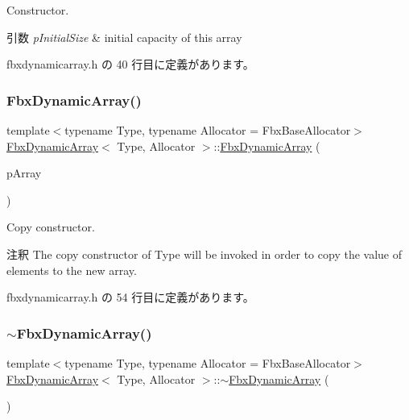 Constructor. 
\begin{DoxyParams}{引数}
{\em p\+Initial\+Size} & initial capacity of this array \\
\hline
\end{DoxyParams}


 fbxdynamicarray.\+h の 40 行目に定義があります。

\mbox{\label{class_fbx_dynamic_array_aa68b84abe44c5dce24e2aa53ae267698}} 
\subsubsection{\texorpdfstring{Fbx\+Dynamic\+Array()}{FbxDynamicArray()}\hspace{0.1cm}{\footnotesize\ttfamily [3/3]}}
{\footnotesize\ttfamily template$<$typename Type, typename Allocator = Fbx\+Base\+Allocator$>$ \\
\hyperlink{class_fbx_dynamic_array}{Fbx\+Dynamic\+Array}$<$ Type, Allocator $>$\+::\hyperlink{class_fbx_dynamic_array}{Fbx\+Dynamic\+Array} (\begin{DoxyParamCaption}\item[{const \hyperlink{class_fbx_dynamic_array}{Fbx\+Dynamic\+Array}$<$ Type, Allocator $>$ \&}]{p\+Array }\end{DoxyParamCaption})\hspace{0.3cm}{\ttfamily [inline]}}

Copy constructor. \begin{DoxyRemark}{注釈}
The copy constructor of {\ttfamily Type} will be invoked in order to copy the value of elements to the new array. 
\end{DoxyRemark}


 fbxdynamicarray.\+h の 54 行目に定義があります。

\mbox{\label{class_fbx_dynamic_array_a4e03e546be9c13e36cff068e0243fa92}} 
\subsubsection{\texorpdfstring{$\sim$\+Fbx\+Dynamic\+Array()}{~FbxDynamicArray()}}
{\footnotesize\ttfamily template$<$typename Type, typename Allocator = Fbx\+Base\+Allocator$>$ \\
\hyperlink{class_fbx_dynamic_array}{Fbx\+Dynamic\+Array}$<$ Type, Allocator $>$\+::$\sim$\hyperlink{class_fbx_dynamic_array}{Fbx\+Dynamic\+Array} (\begin{DoxyParamCaption}{ }\end{DoxyParamCaption})\hspace{0.3cm}{\ttfamily [inline]}}




